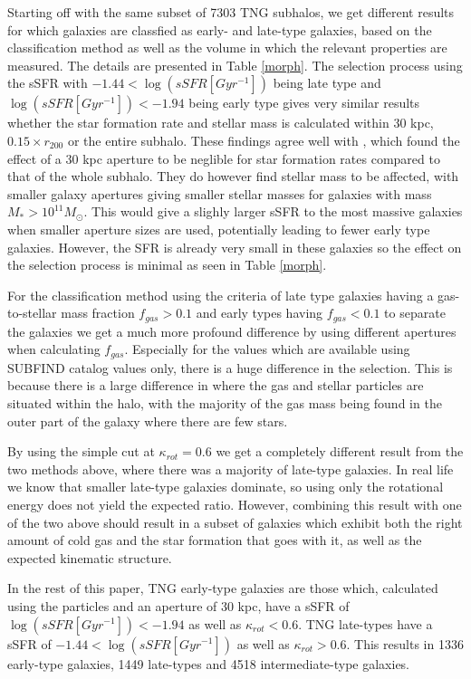 Starting off with the same subset of 7303 TNG subhalos, we get different results for which galaxies are classfied as early- and late-type galaxies, based on the classification method as well as the volume in which the relevant properties are measured. The details are presented in Table \ref{morph}. The selection process using the sSFR with $ -1.44 < \log (sSFR[Gyr^{-1}]) $ being late type and $\log (sSFR[Gyr^{-1}]) < -1.94$ being early type gives very similar results whether the star formation rate and stellar mass is calculated within 30 kpc, $0.15 \times r_{200}$ or the entire subhalo. These findings agree well with \textcite{Schaye2015}, which found the effect of a 30 kpc aperture to be neglible for star formation rates compared to that of the whole subhalo. They do however find stellar mass to be affected, with smaller galaxy apertures giving smaller stellar masses for galaxies with mass $M_* > 10^{11}M_{\odot}$. This would give a slighly larger sSFR to the most massive galaxies when smaller aperture sizes are used, potentially leading to fewer early type galaxies. However, the SFR is already very small in these galaxies so the effect on the selection process is minimal as seen in Table \ref{morph}.

For the classification method using the criteria of late type galaxies having a gas-to-stellar mass fraction $f_{gas} > 0.1$ and early types having $f_{gas} < 0.1$ to separate the galaxies we get a much more profound difference by using different apertures when calculating $f_{gas}$. Especially for the values which are available using SUBFIND catalog values only, there is a huge difference in the selection. This is because there is a large difference in where the gas and stellar particles are situated within the halo, with the majority of the gas mass being found in the outer part of the galaxy where there are few stars.

By using the simple cut at $\kappa_{rot} = 0.6$ we get a completely different result from the two methods above, where there was a majority of late-type galaxies. In real life we know that smaller late-type galaxies dominate, so using only the rotational energy does not yield the expected ratio. However, combining this result with one of the two above should result in a subset of galaxies which exhibit both the right amount of cold gas and the star formation that goes with it, as well as the expected kinematic structure.

In the rest of this paper, TNG early-type galaxies are those which, calculated using the particles and an aperture of 30 kpc, have a sSFR of $\log (sSFR[Gyr^{-1}]) < -1.94$ as well as $\kappa_{rot} < 0.6$. TNG late-types have a sSFR of $ -1.44 < \log (sSFR[Gyr^{-1}]) $ as well as $\kappa_{rot} > 0.6$. This results in 1336 early-type galaxies, 1449 late-types and 4518 intermediate-type galaxies.

